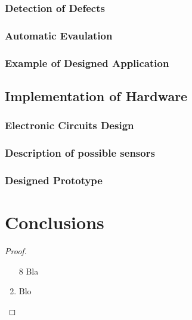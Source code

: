 \documentclass[twoside]{ctuthesis}
\theoremstyle{plain}
\theoremstyle{definition}
\theoremstyle{note}
\begin{document}
\subsection{Detection of Defects}
\subsection{Automatic Evaulation}
\subsection{Example of Designed Application}
\section{Implementation of Hardware}
\subsection{Electronic Circuits Design}
\subsection{Description of possible sensors}
\subsection{Designed Prototype}
\chapter{Conclusions}


\medskip

\begin{proof}\begin{enumerate} \item[8] Bla \item Blo \end{enumerate} \end{proof}

\appendix

\printindex

\appendix

%



\end{document}
